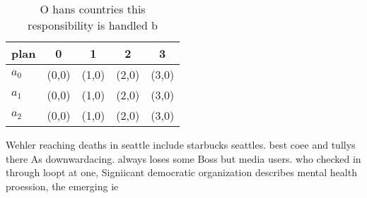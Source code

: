 \documentclass[a4paper]{article}
\begin{document}
\begin{table}
\begin{adjustbox}{width=0.5\columnwidth}
\begin{tabular}{|l|l|l|l|l|}
\hline
\textbf{plan} & \multicolumn{1}{c|}{\textbf{0}} & \multicolumn{1}{c|}{\textbf{1}} & \multicolumn{1}{c|}{\textbf{2}} & \multicolumn{1}{c|}{\textbf{3}} \\ \hline
\textbf{$a_0$}  & (0,0) & (1,0) & (2,0) & (3,0) \\ \hline
\textbf{$a_1$}  & (0,0) & (1,0) & (2,0) & (3,0) \\ \hline
\textbf{$a_2$}  & (0,0) & (1,0) & (2,0) & (3,0) \\ \hline
\end{tabular}
\end{adjustbox}
\caption{O hans countries this responsibility is handled b
}
\end{table}

Wehler reaching deaths in seattle include starbucks seattles. best coee and tullys there As downwardacing. always loses some Boss but media users. who checked in through loopt at one, Signiicant democratic organization describes mental health proession, the emerging ie
\end{document}
